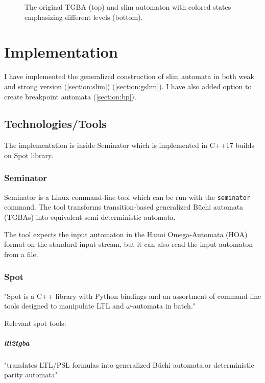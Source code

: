 \documentclass[
	digital,
nolof, nolot
]{fithesis3}
\begin{document}
						
			\begin{figure}[ht]
				\begin{center}
					
					
				\end{center}
				\caption{The original TGBA (top) and slim automaton with colored states emphasizing different levels (bottom).  }
				\label{fig:slim:gg}
			\end{figure}
			

			
	\chapter{Implementation} \label{implementation}
		I have implemented the generalized construction of slim automata in both weak and strong version  (\ref{section:slim}) (\ref{section:gslim}). I have also added option to create breakpoint automata (\ref{section:bp}).
		
		\section{Technologies/Tools}
		The implementation is inside Seminator which is implemented in C++17 builds on Spot library. %
		\subsection{Seminator} 
		Seminator is a Linux command-line tool which can be run with the \texttt{seminator} command. The tool transforms transition-based generalized Büchi automata (TGBAs) into equivalent semi-deterministic automata. \cite{Klokočka2017thesis}\cite{seminator}\cite{seminator2}
		
		
		
		The tool expects the input automaton in the Hanoi Omega-Automata (HOA) format \cite{DBLP:conf/cav/BabiakBDKKM0S15} on the standard input stream, but it can also read the input automaton from a file.
		
	\subsection{Spot}
	"Spot is a C++ library with Python bindings and an assortment of command-line tools designed to manipulate LTL and $\omega$-automata in batch." \cite[Abstract]{spot2}
	
	Relevant spot tools:
	\paragraph{ltl2tgba} "translates LTL/PSL formulas into generalized Büchi automata,or deterministic parity automata" \cite{spot}
\end{document}

